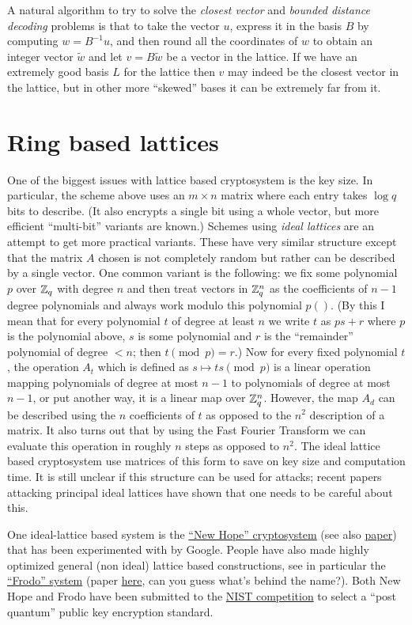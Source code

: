 A natural algorithm to try to solve the \emph{closest vector} and
\emph{bounded distance decoding} problems is that to take the vector
\(u\), express it in the basis \(B\) by computing \(w = B^{-1}u\), and
then round all the coordinates of \(w\) to obtain an integer vector
\(\tilde{w}\) and let \(v=B\tilde{w}\) be a vector in the lattice. If we
have an extremely good basis \(L\) for the lattice then \(v\) may indeed
be the closest vector in the lattice, but in other more ``skewed'' bases
it can be extremely far from it.

\section{Ring based lattices}\label{Ring-based-lattices}

One of the biggest issues with lattice based cryptosystem is the key
size. In particular, the scheme above uses an \(m\times n\) matrix where
each entry takes \(\log q\) bits to describe. (It also encrypts a single
bit using a whole vector, but more efficient ``multi-bit'' variants are
known.) Schemes using \emph{ideal lattices} are an attempt to get more
practical variants. These have very similar structure except that the
matrix \(A\) chosen is not completely random but rather can be described
by a single vector. One common variant is the following: we fix some
polynomial \(p\) over \({\mathbb{Z}}_q\) with degree \(n\) and then treat vectors
in \({\mathbb{Z}}_q^n\) as the coefficients of \(n-1\) degree polynomials and
always work modulo this polynomial \(p()\). (By this I mean that for
every polynomial \(t\) of degree at least \(n\) we write \(t\) as
\(ps+r\) where \(p\) is the polynomial above, \(s\) is some polynomial
and \(r\) is the ``remainder'' polynomial of degree \(<n\); then
\(t \pmod{p} = r\).) Now for every fixed polynomial \(t\), the operation
\(A_t\) which is defined as \(s \mapsto ts \pmod{p}\) is a linear
operation mapping polynomials of degree at most \(n-1\) to polynomials
of degree at most \(n-1\), or put another way, it is a linear map over
\({\mathbb{Z}}_q^n\). However, the map \(A_d\) can be described using the \(n\)
coefficients of \(t\) as opposed to the \(n^2\) description of a matrix.
It also turns out that by using the Fast Fourier Transform we can
evaluate this operation in roughly \(n\) steps as opposed to \(n^2\).
The ideal lattice based cryptosystem use matrices of this form to save
on key size and computation time. It is still unclear if this structure
can be used for attacks; recent papers attacking principal ideal
lattices have shown that one needs to be careful about this.

One ideal-lattice based system is the
\href{https://newhopecrypto.org/}{``New Hope'' cryptosystem} (see also
\href{https://eprint.iacr.org/2015/1092.pdf}{paper}) that has been
experimented with by Google. People have also made highly optimized
general (non ideal) lattice based constructions, see in particular the
\href{https://frodokem.org/}{``Frodo'' system} (paper
\href{https://eprint.iacr.org/2016/659}{here}, can you guess what's
behind the name?). Both New Hope and Frodo have been submitted to the
\href{https://csrc.nist.gov/Projects/Post-Quantum-Cryptography}{NIST
competition} to select a ``post quantum'' public key encryption
standard.

